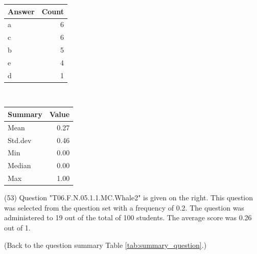 \documentclass[12pt,nohyper]{tufte-handout}\usepackage[]{graphicx}\usepackage[]{color}
\begin{document}
\begin{center}%
\begin{tabular}{lr}
  \hline
Answer & Count \\ 
  \hline
a &   6 \\ 
  c &   6 \\ 
  b &   5 \\ 
  e &   4 \\ 
  d &   1 \\ 
   \hline
\end{tabular}
~~~~~~~~%
\begin{tabular}{lr}
  \hline
Summary & Value \\ 
  \hline
Mean & 0.27 \\ 
  Std.dev & 0.46 \\ 
  Min & 0.00 \\ 
  Median & 0.00 \\ 
  Max & 1.00 \\ 
   \hline
\end{tabular}
\end{center}\newpage{} (53) Question "T06.F.N.05.1.1.MC.Whale2" is given on the right. This question was selected from the question set with a frequency of 0.2. The question was administered to 19 out of the total of 100 students. The average score was 0.26 out of 1.

 (Back to the question summary Table \ref{tab:summary_question}.)
\end{document}
